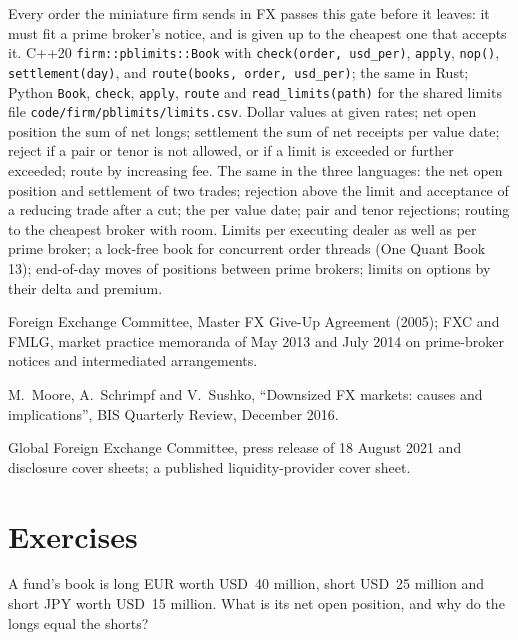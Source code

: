\begin{build}
 Every order the miniature firm sends in FX passes this gate before it
leaves: it must fit a prime broker's notice, and is given up to the cheapest one that
accepts it.
 C++20 \texttt{firm::pblimits::Book} with \texttt{check(order,
usd\_per)}, \texttt{apply}, \texttt{nop()}, \texttt{settlement(day)}, and
\texttt{route(books, order, usd\_per)}; the same in Rust; Python \texttt{Book},
\texttt{check}, \texttt{apply}, \texttt{route} and \texttt{read\_limits(path)} for the
shared limits file \texttt{code/firm/pblimits/limits.csv}.
 Dollar values at given rates; net open position the sum of net longs;
settlement the sum of net receipts per value date; reject if a pair or tenor is not
allowed, or if a limit is exceeded or further exceeded; route by increasing fee.
 The same in the three languages: the net open position and
settlement of two trades; rejection above the limit and acceptance of a reducing trade
after a cut; the  per value date; pair and tenor rejections; routing
to the cheapest broker with room.
 Limits per executing dealer as well as per prime broker; a
lock-free book for concurrent order threads (One Quant Book 13); end-of-day moves of
positions between prime brokers; limits on options by their delta and premium.
\end{build}

\begin{omsources}
\item Foreign Exchange Committee, Master FX Give-Up Agreement (2005); FXC and FMLG,
market practice memoranda of May 2013 and July 2014 on prime-broker notices and
intermediated arrangements.
\item M.~Moore, A.~Schrimpf and V.~Sushko, ``Downsized FX markets: causes and
implications'', BIS Quarterly Review, December 2016.
\item Global Foreign Exchange Committee, press release of 18 August 2021 and disclosure
cover sheets; a published liquidity-provider cover sheet.
\end{omsources}

\section{Exercises}

\begin{exercise}[$\star$]\label{exo:m2:getting-access-fx:1}
A fund's book is long EUR worth USD~40 million, short USD~25 million and short JPY worth
USD~15 million. What is its net open position, and why do the longs equal the shorts?
\end{exercise}

